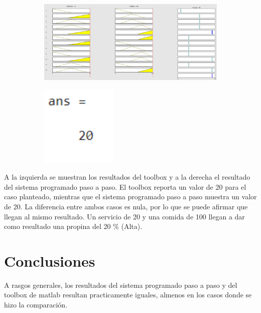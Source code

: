 \documentclass[11pt, letterpaper]{article}
\begin{document}
\begin{figure}[h]
	\centering
	\begin{subfigure}{0.40\textwidth} %
		\centering
		\includegraphics[width=1.4\textwidth]{IMG/RP13.png}
		\label{fig:G7}
	\end{subfigure}
	\hfill
	\begin{subfigure}{0.42\textwidth} %
		\centering
		\includegraphics[width=0.4\textwidth]{IMG/M13.png}
		\label{fig:G8}
	\end{subfigure}
	\label{fig:comparacion4}
\end{figure}

A la izquierda se muestran los resultados del toolbox y a la derecha el resultado del sistema programado paso a paso. El toolbox reporta un valor de 20 para el caso planteado, mientras que el sistema programado paso a paso muestra un valor de 20. La diferencia entre ambos casos es nula, por lo que se puede afirmar que llegan al mismo resultado. Un servicio de 20 y una comida de 100 llegan a dar como resultado una propina del 20 \% (Alta).


\section{Conclusiones}

A rasgos generales, los resultados del sistema programado paso a paso y del toolbox de matlab resultan practicamente iguales, almenos en los casos donde se hizo la comparación.
\end{document}
